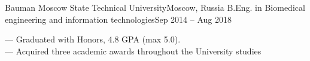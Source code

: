 \resumeSubheading
{Bauman Moscow State Technical University}{Moscow, Russia}
{B.Eng. in Biomedical engineering and information technologies}{Sep 2014 -- Aug 2018}
\begin{itemize}[leftmargin=0in, label={}]
    \small{\item{
        {— Graduated with Honors, 4.8 GPA (max 5.0).}\\
        {— Acquired three academic awards throughout the University studies}\\
    }}
\end{itemize}
